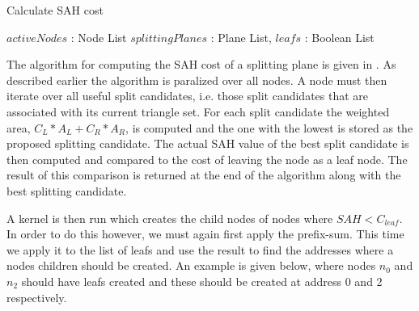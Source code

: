 \begin{algorithm}
  \caption{Calculate SAH cost}
  \label{alg:calcSAHCost}
  \begin{algorithmic}
              {$activeNodes$ : Node List}
              {$splittingPlanes$ : Plane List, $leafs$ : Boolean List}{
                  \ENDFOR
                \ENDFOR
              }
  \end{algorithmic}
\end{algorithm}


The algorithm for computing the SAH cost of a splitting plane is given
in . As described earlier the algorithm is
paralized over all nodes. A node must then iterate over all useful
split candidates, i.e. those split candidates that are associated with
its current triangle set. For each split candidate the weighted area,
$C_L * A_L + C_R * A_R$, is computed and the one with the lowest is
stored as the proposed splitting candidate. The actual SAH value of
the best split candidate is then computed and compared to the cost of
leaving the node as a leaf node. The result of this comparison is
returned at the end of the algorithm along with the best splitting
candidate.


A kernel is then run which creates the child nodes of nodes where $SAH
< C_{leaf}$. In order to do this however, we must again first apply
the prefix-sum. This time we apply it to the list of leafs and use the
result to find the addresses where a nodes children should be
created. An example is given below, where nodes $n_0$ and $n_2$ should
have leafs created and these should be created at address 0 and 2
respectively.

